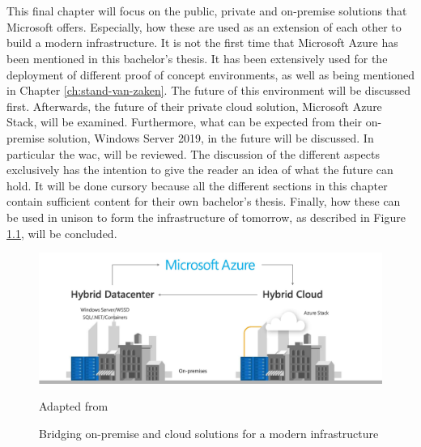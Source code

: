 \chapter{}
\label{ch:toekomstvisie}
This final chapter will focus on the public, private and on-premise solutions that Microsoft offers. 
Especially, how these are used as an extension of each other to build a modern infrastructure. 
It is not the first time that Microsoft Azure has been mentioned in this bachelor's thesis. 
It has been extensively used for the deployment of different proof of concept environments, as well as being mentioned in Chapter \ref{ch:stand-van-zaken}. 
The future of this environment will be discussed first. 
Afterwards, the future of their private cloud solution, Microsoft Azure Stack, will be examined. 
Furthermore, what can be expected from their on-premise solution, Windows Server 2019, in the future will be discussed. 
In particular the \acrlong{wac}, will be reviewed. 
The discussion of the different aspects exclusively has the intention to give the reader an idea of what the future can hold. 
It will be done cursory because all the different sections in this chapter contain sufficient content for their own bachelor's thesis. 
Finally, how these can be used in unison to form the infrastructure of tomorrow, as described in Figure \ref{fig:Azure_FullCircle}, will be concluded.

\begin{figure}[h]
	\captionsetup{width=0.6\linewidth}
	\includegraphics[width=0.7\linewidth]{img/Toekomstvisie/Azure1.png}
	\centering
	\caption[Modern infrastructure]{Bridging on-premise and cloud solutions for a modern infrastructure}
	\scriptsize	
	Adapted from \cite{Singh2019}
	\label{fig:Azure_FullCircle}
\end{figure}

\clearpage

